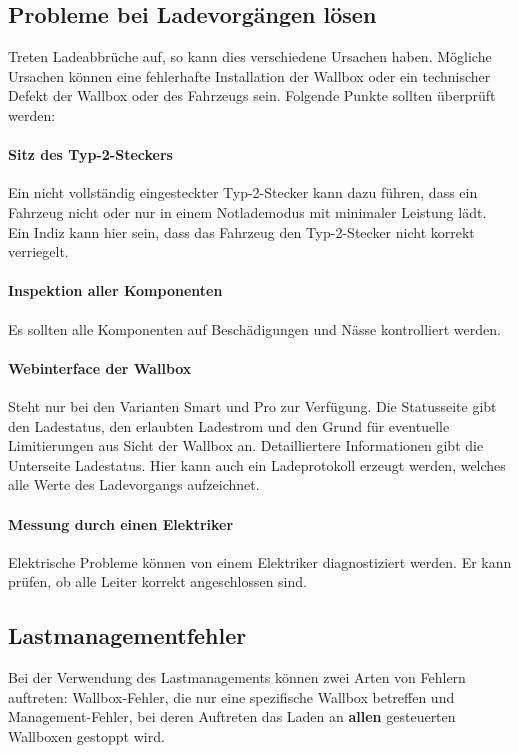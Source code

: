 \documentclass[a4paper,10pt]{article}
\begin{document}
\begin{multicols*}{2}
    \vspace{-0.2cm}
    \subsection{Probleme bei Ladevorgängen lösen}
    \vspace{-0.1cm}
    Treten Ladeabbrüche auf, so kann dies verschiedene Ursachen haben. Mögliche
    Ursachen können eine fehlerhafte Installation der Wallbox oder ein
    technischer Defekt der Wallbox oder des Fahrzeugs sein.
    Folgende Punkte sollten überprüft werden:

    \vspace{-0.2cm}
    \paragraph*{Sitz des Typ-2-Steckers} Ein nicht vollständig eingesteckter Typ-2-Stecker kann dazu führen,
        dass ein Fahrzeug nicht oder nur in einem Notlademodus mit minimaler Leistung lädt. Ein Indiz kann hier sein, dass
        das Fahrzeug den Typ-2-Stecker nicht korrekt verriegelt.
    \paragraph{Inspektion aller Komponenten} Es sollten alle Komponenten
        auf Beschädigungen und Nässe kontrolliert werden.
    \paragraph{Webinterface der Wallbox} Steht nur bei den Varianten Smart und
        Pro zur Verfügung. Die Statusseite gibt den Ladestatus, den erlaubten Ladestrom und den Grund für eventuelle Limitierungen aus
        Sicht der Wallbox an. Detailliertere Informationen gibt die
        Unterseite Ladestatus. Hier kann auch ein Ladeprotokoll
        erzeugt werden, welches alle Werte des Ladevorgangs aufzeichnet.
    \paragraph{Messung durch einen Elektriker} Elektrische Probleme können von
        einem Elektriker diagnostiziert werden. Er kann prüfen, ob alle Leiter
        korrekt angeschlossen sind.

    \vspace{-0.2cm}
    \subsection{Lastmanagementfehler}
    \vspace{-0.1cm}
    Bei der Verwendung des Lastmanagements können zwei Arten von Fehlern auftreten: Wallbox-Fehler, die nur eine spezifische Wallbox betreffen und Management-Fehler,
    bei deren Auftreten das Laden an \textbf{allen} gesteuerten Wallboxen gestoppt wird.


\end{multicols*}
\end{document}
